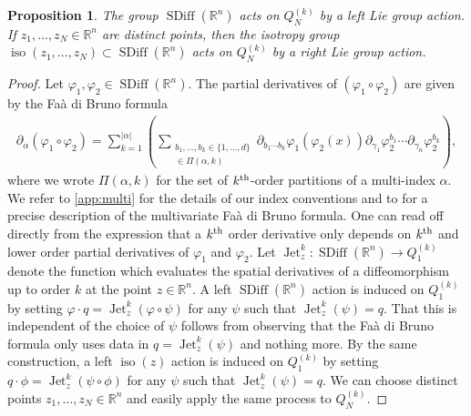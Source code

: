 \documentclass[12pt]{amsart}
\newcommand{\R}{\ensuremath{\mathbb{R}}}
\newtheorem{prop}[thm]{Proposition}
\DeclareMathOperator{\SDiff}{SDiff}
\DeclareMathOperator{\Jet}{Jet}
\DeclareMathOperator{\iso}{iso}
\begin{document}
  \begin{prop}
    The group $\SDiff(\R^n)$ acts on $Q_N^{(k)}$ by a left Lie group
    action.  If $z_1 ,\dots,z_N \in \R^n$ are distinct points,
    then the isotropy group $\iso(z_1,\dots,z_N) \subset \SDiff(\R^n)$
    acts on $Q_N^{(k)}$ by a right Lie group action.
  \end{prop}
  \begin{proof}
    Let $\varphi_1,\varphi_2 \in \SDiff(\R^n)$.
    The partial derivatives of $(\varphi_1 \circ \varphi_2)$
    are given by the Fa\`a di Bruno formula
    \begin{align*}
      \partial_\alpha( \varphi_1 \circ \varphi_2) = \sum_{k=1}^{|\alpha|}
      \left(
        \sum_{
        \substack{
          b_1,\dots,b_k \in \{1,\dots,d\} \\
          [\gamma_1,\dots,\gamma_k] \in \Pi(\alpha , k)
          }
          }
          \partial_{b_1 \cdots b_k} \varphi_1(\varphi_2(x)) 
          \partial_{\gamma_1} \varphi_2^{b_1} \cdots
          \partial_{\gamma_n} \varphi_2^{b_k}
        \right),
    \end{align*}
where we wrote $\Pi(\alpha, k)$ for the set of $k^{\rm th}$-order partitions of a multi-index $\alpha$. We refer to \ref{app:multi} for the details of our index conventions and to \cite{ConstantineSavits1996,Jacobs2014b} for a
    precise description of the multivariate Fa\`a di Bruno formula.
    One can read off  directly from the expression that
    a $k^{\rm th}$ order derivative only depends on $k^{\rm th}$
    and lower order
    partial derivatives of $\varphi_1$ and $\varphi_2$.
    Let $\Jet^k_z: \SDiff(\R^n) \to Q_1^{(k)}$ denote
    the function which evaluates the spatial derivatives
    of a diffeomorphism up to order $k$ at the point $z \in \R^n$.
    A left $\SDiff(\R^n)$ action is induced on $Q_1^{(k)}$ by
    setting $\varphi \cdot q = \Jet^k_z( \varphi \circ \psi)$
    for any $\psi$ such that $\Jet^k_z(\psi) = q$.
    That this is independent of the choice of $\psi$ follows
    from observing that the Fa\`a di Bruno formula
    only uses data in $q = \Jet^k_z(\psi)$ and nothing more.
    By the same construction, a left $\iso(z)$ action is induced
    on $Q_1^{(k)}$ by setting $q \cdot \phi = \Jet^k_z ( \psi \circ \phi)$ for any $\psi$ such that $\Jet^k_z(\psi) = q$.
    We can choose distinct points $z_1,\dots,z_N \in \R^n$
    and easily apply the same process to $Q_N^{(k)}$.
  \end{proof}
  
\end{document}
